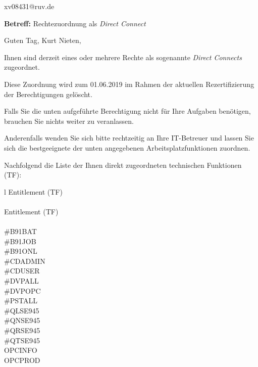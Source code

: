 \documentclass[a4paper,landscape,12pt]{letter}
\begin{document}
\begin{letter}{xv08431@ruv.de\hfill \break}
\begin{normalsize}
	\opening{\textbf{Betreff:} Rechtezuordnung als \emph{Direct Connect}}
	\begin{normalsize} \hfill
	\end{normalsize}

	\begin{normalsize}
		Guten Tag, 
	Kurt Nieten, \hfill \break
	\end{normalsize}
	\end{normalsize}
	
\begin{normalsize}
	Ihnen sind derzeit eines oder mehrere Rechte als sogenannte \emph{Direct Connects} zugeordnet.
	
	Diese Zuordnung wird zum 01.06.2019 im Rahmen der aktuellen Rezertifizierung der Berechtigungen gelöscht.
	
	Falls Sie die unten aufgeführte Berechtigung nicht für Ihre Aufgaben benötigen, 
	brauchen Sie nichts weiter zu veranlassen.
	
	Anderenfalls wenden Sie sich bitte rechtzeitig an Ihre IT-Betreuer 
	und lassen Sie sich die bestgeeignete der unten angegebenen Arbeitsplatzfunktionen zuordnen.
	\end{normalsize}
	
\begin{normalsize}
	Nachfolgend die Liste der Ihnen direkt zugeordneten technischen Funktionen (TF):

	\begin{longtable}{l}
		Entitlement (TF) \\ \hline
		\endfirsthead
		\\\hline
		Entitlement (TF) \\ \hline
		\endhead %
		\multicolumn{1}{r@{}}{Fortsetzung \ldots}\\
		\endfoot
		\hline
		\endlastfoot
	\#B91BAT\\\#B91JOB\\\#B91ONL\\\#CDADMIN\\\#CDUSER\\\#DVPALL\\\#DVPOPC\\\#PSTALL\\\#QLSE945\\\#QNSE945\\\#QRSE945\\\#QTSE945\\OPCINFO\\OPCPROD\\
	\end{longtable}
	\end{normalsize}
	

\end{letter}
\end{document}
